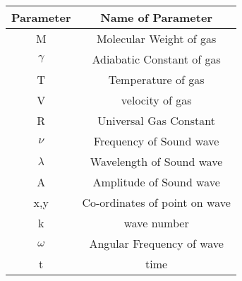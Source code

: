 \begin{tabular}{|c|c|}
        \hline
         Parameter & Name of Parameter  \\
        \hline
         M & Molecular Weight of gas\\
         \hline
         $\gamma$ & Adiabatic Constant of gas\\
         \hline
         T & Temperature of gas \\
         \hline
         V & velocity of gas \\
         \hline
         R & Universal Gas Constant \\
         \hline
         $\nu$ & Frequency of Sound wave \\
         \hline
         $\lambda$ & Wavelength of Sound wave\\
         \hline
         A & Amplitude of Sound wave\\
         \hline
         x,y & Co-ordinates of point on wave\\
         \hline
         k & wave number\\
         \hline
         $\omega$ & Angular Frequency of wave\\
         \hline
         t & time\\
         \hline
    \end{tabular}
